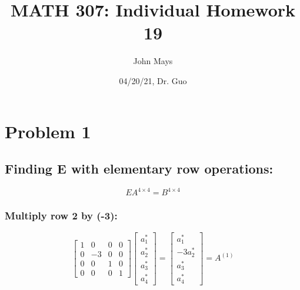 \documentclass[fleqn]{article}
\title{\textbf{MATH 307: Individual Homework 19}}
\author{John Mays}
\date{04/20/21, Dr. Guo}
\begin{document}
\maketitle

\section*{Problem 1}
\subsection*{Finding E with elementary row operations:}
\begin{equation*}
    EA^{4 \times 4} = B^{4 \times 4}
\end{equation*}
\subsubsection*{Multiply row 2 by (-3):}
\begin{equation*}
    \begin{bmatrix}1&0&0&0\\0&-3&0&0\\0&0&1&0\\0&0&0&1\end{bmatrix}\begin{bmatrix}a^{*}_1\\a^{*}_2\\a^{*}_3\\a^{*}_4\end{bmatrix} = \begin{bmatrix}a^{*}_1\\-3a^{*}_2\\a^{*}_3\\a^{*}_4\end{bmatrix} = A^{(1)}
\end{equation*}
\end{document}
